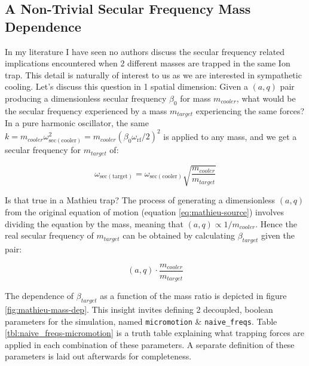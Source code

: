 \subsection{A Non-Trivial Secular Frequency Mass Dependence}\label{ssec:non-trivial-mass-dep}

In my literature I have seen no authors discuss the secular frequency related implications encountered when 2 different masses are trapped in the same Ion trap. This detail is naturally of interest to us as we are interested in sympathetic cooling. Let's discuss this question in 1 spatial dimension: Given a $(a,q)$ pair producing a dimensionless secular frequency $\beta_0$ for mass $m_{cooler}$, what would be the secular frequency experienced by a mass $m_{target}$ experiencing the same forces? In a pure harmonic oscillator, the same $k = m_{cooler} \omega_{\mathrm{sec(cooler)}}^2 = m_{cooler} (\beta_0 \omega_\mathrm{rf}/2)^2$ is applied to any mass, and we get a secular frequency for $m_{target}$ of:

\begin{equation}
	\omega_\mathrm{sec(target)} = \omega_\mathrm{sec(cooler)}\sqrt{\frac{m_{cooler}}{m_{target}}} 
	\label{eq:mathieu-naive-sec-freq}
\end{equation}

Is that true in a Mathieu trap? The process of generating a dimensionless $(a,q)$ from the original equation of motion (equation \ref{eq:mathieu-source}) involves dividing the equation by the mass, meaning that $(a,q)\propto 1/m_{cooler}$. Hence the real secular frequency of $m_{target}$ can be obtained by calculating $\beta_{target}$ given the pair:

$$(a,q)\cdot \frac{m_{cooler}}{m_{target}}$$

The dependence of $\beta_{target}$ as a function of the mass ratio is depicted in figure \ref{fig:mathieu-mass-dep}. This insight invites defining 2 decoupled, boolean parameters for the simulation, named \texttt{micromotion} \& \texttt{naive\_freqs}. Table \ref{tbl:naive_freqs-micromotion} is a truth table explaining what trapping forces are applied in each combination of these parameters. A separate definition of these parameters is laid out afterwards for completeness.


